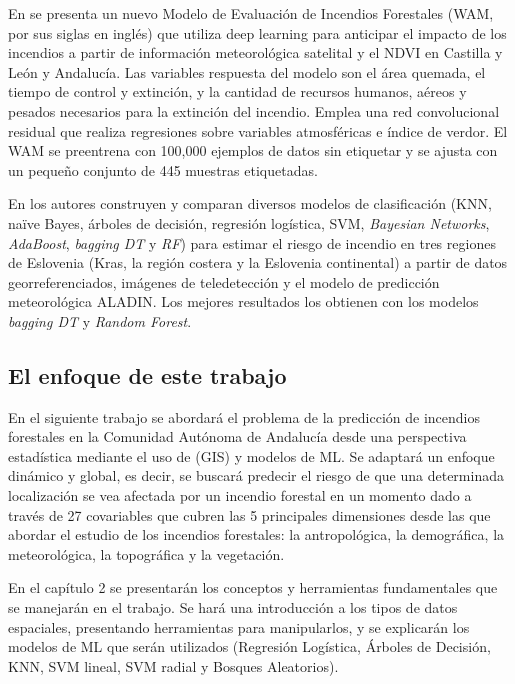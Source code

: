 \documentclass[12pt,a4paper,]{book}
\numberwithin{dummy}{section}
\theoremstyle{ocrenumbox}
\theoremstyle{blacknumex}
\theoremstyle{blacknumbox}
\theoremstyle{ocrenum}
\theoremstyle{ocrenum}
\begin{document}
En \citet{SpainOnFire} se presenta un nuevo Modelo de Evaluación de
Incendios Forestales (WAM, por sus siglas en inglés) que utiliza deep
learning para anticipar el impacto de los incendios a partir de
información meteorológica satelital y el NDVI en Castilla y León y
Andalucía. Las variables respuesta del modelo son el área quemada, el
tiempo de control y extinción, y la cantidad de recursos humanos, aéreos
y pesados necesarios para la extinción del incendio. Emplea una red
convolucional residual que realiza regresiones sobre variables
atmosféricas e índice de verdor. El WAM se preentrena con 100,000
ejemplos de datos sin etiquetar y se ajusta con un pequeño conjunto de
445 muestras etiquetadas.

En \citet{stojanova2012estimating} los autores construyen y comparan
diversos modelos de clasificación (KNN, naïve Bayes, árboles de
decisión, regresión logística, SVM, \emph{Bayesian Networks},
\emph{AdaBoost}, \emph{bagging DT} y \emph{RF}) para estimar el riesgo
de incendio en tres regiones de Eslovenia (Kras, la región costera y la
Eslovenia continental) a partir de datos georreferenciados, imágenes de
teledetección y el modelo de predicción meteorológica ALADIN. Los
mejores resultados los obtienen con los modelos \emph{bagging DT} y
\emph{Random Forest}.

\hypertarget{el-enfoque-de-este-trabajo}{%
\subsection*{El enfoque de este
trabajo}\label{el-enfoque-de-este-trabajo}}

En el siguiente trabajo se abordará el problema de la predicción de
incendios forestales en la Comunidad Autónoma de Andalucía desde una
perspectiva estadística mediante el uso de (GIS) y modelos de ML. Se
adaptará un enfoque dinámico y global, es decir, se buscará predecir el
riesgo de que una determinada localización se vea afectada por un
incendio forestal en un momento dado a través de 27 covariables que
cubren las 5 principales dimensiones desde las que abordar el estudio de
los incendios forestales: la antropológica, la demográfica, la
meteorológica, la topográfica y la vegetación.

En el capítulo 2 se presentarán los conceptos y herramientas
fundamentales que se manejarán en el trabajo. Se hará una introducción a
los tipos de datos espaciales, presentando herramientas para
manipularlos, y se explicarán los modelos de ML que serán utilizados
(Regresión Logística, Árboles de Decisión, KNN, SVM lineal, SVM radial y
Bosques Aleatorios).
\end{document}
